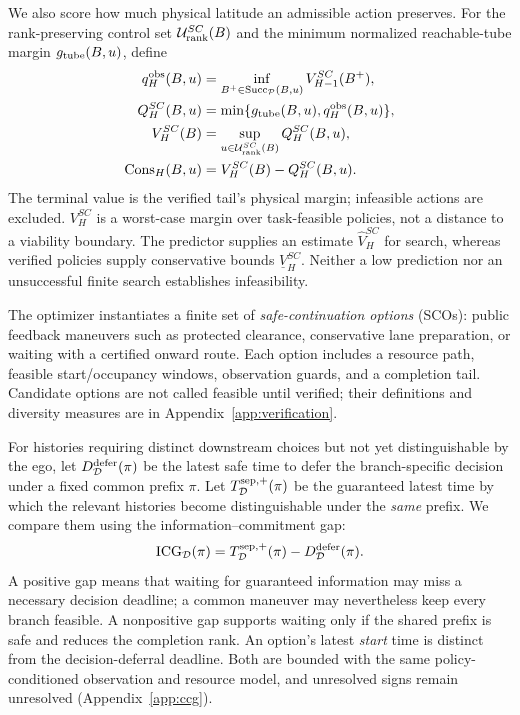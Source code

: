 \documentclass[letterpaper]{article} %
\begin{document}
We also score how much physical latitude an admissible action preserves. For the rank-preserving control set $\mathcal U_{\rm rank}^{SC}(B)$ and the minimum normalized reachable-tube margin $g_{\rm tube}(B,u)$, define
\begin{align}
q_H^{\rm obs}(B,u)&=\inf_{B^+\in\operatorname{Succ}_{\mathcal P}(B,u)}
V_{H-1}^{SC}(B^+),\nonumber\\
Q_H^{SC}(B,u)&=\min\{g_{\rm tube}(B,u),q_H^{\rm obs}(B,u)\},\nonumber\\
V_H^{SC}(B)&=\sup_{u\in\mathcal U_{\rm rank}^{SC}(B)}Q_H^{SC}(B,u),\nonumber\\
\operatorname{Cons}_H(B,u)&=V_H^{SC}(B)-Q_H^{SC}(B,u).
\label{eq:sc-value}
\end{align}
The terminal value is the verified tail's physical margin; infeasible actions are excluded. $V_H^{SC}$ is a worst-case margin over task-feasible policies, not a distance to a viability boundary. The predictor supplies an estimate $\widehat V_H^{SC}$ for search, whereas verified policies supply conservative bounds $\underline V_H^{SC}$. Neither a low prediction nor an unsuccessful finite search establishes infeasibility.

The optimizer instantiates a finite set of \emph{safe-continuation options} (SCOs): public feedback maneuvers such as protected clearance, conservative lane preparation, or waiting with a certified onward route. Each option includes a resource path, feasible start/occupancy windows, observation guards, and a completion tail. Candidate options are not called feasible until verified; their definitions and diversity measures are in Appendix~\ref{app:verification}.

For histories requiring distinct downstream choices but not yet distinguishable by the ego, let $D_{\mathcal D}^{\rm defer}(\pi)$ be the latest safe time to defer the branch-specific decision under a fixed common prefix $\pi$. Let $T_{\mathcal D}^{\rm sep,+}(\pi)$ be the guaranteed latest time by which the relevant histories become distinguishable under the \emph{same} prefix. We compare them using the information--commitment gap:
\begin{equation}
\operatorname{ICG}_{\mathcal D}(\pi)=
T_{\mathcal D}^{\rm sep,+}(\pi)-D_{\mathcal D}^{\rm defer}(\pi).
\label{eq:icg}
\end{equation}
A positive gap means that waiting for guaranteed information may miss a necessary decision deadline; a common maneuver may nevertheless keep every branch feasible. A nonpositive gap supports waiting only if the shared prefix is safe and reduces the completion rank. An option's latest \emph{start} time is distinct from the decision-deferral deadline. Both are bounded with the same policy-conditioned observation and resource model, and unresolved signs remain unresolved (Appendix~\ref{app:ccg}).
\end{document}
